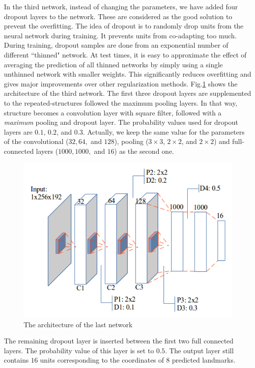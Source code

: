 \documentclass[conference]{IEEEtran}
\begin{document}
In the third network, instead of changing the parameters, we have added four dropout layers to the network. These are considered as the good solution to prevent the overfitting. The idea of dropout is to randomly drop units from the neural network during training. It prevents units from co-adapting too much. During training, dropout samples are done from an exponential number of different ``thinned" network. At test times, it is easy to approximate the effect of averaging the prediction of all thinned networks by simply using a single unthinned network with smaller weights. This significantly reduces overfitting and gives major improvements over other regularization methods\cite{srivastava2014dropout}. Fig.\ref{figarch} shows the architecture of the third network. The first three dropout layers are supplemented to the repeated-structures followed the maximum pooling layers. In that way, structure becomes a convolution layer with square filter, followed with a \textit{maximum} pooling and dropout layer. The probability values used for dropout layers are $0.1$, $0.2$, and $0.3$. Actually, we keep the same value for the parameters of the convolutional ($32, 64,$ and $128$), pooling ($3 \times 3$, $2 \times 2$, and $2 \times 2$) and full-connected layers ($1000, 1000,$ and $16$) as the second one.

\begin{figure}[htbp]
	\centerline{\includegraphics[scale=0.45]{images/architecture3}}
	\caption{The architecture of the last network}
	\label{figarch}
\end{figure}

The remaining dropout layer is inserted between the first two full connected layers. The probability value of this layer is set to $0.5$. The output layer still contains $16$ units corresponding to the coordinates of $8$ predicted landmarks.%
\end{document}
